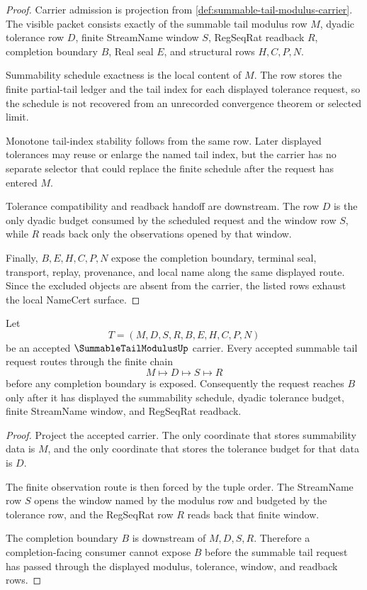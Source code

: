 \begin{proof}
Carrier admission is projection from \autoref{def:summable-tail-modulus-carrier}. The visible packet consists exactly of the summable tail modulus row $M$, dyadic tolerance row $D$, finite StreamName window $S$, RegSeqRat readback $R$, completion boundary $B$, Real seal $E$, and structural rows $H,C,P,N$.

Summability schedule exactness is the local content of $M$. The row stores the finite partial-tail ledger and the tail index for each displayed tolerance request, so the schedule is not recovered from an unrecorded convergence theorem or selected limit.

Monotone tail-index stability follows from the same row. Later displayed tolerances may reuse or enlarge the named tail index, but the carrier has no separate selector that could replace the finite schedule after the request has entered $M$.

Tolerance compatibility and readback handoff are downstream. The row $D$ is the only dyadic budget consumed by the scheduled request and the window row $S$, while $R$ reads back only the observations opened by that window.

Finally, $B,E,H,C,P,N$ expose the completion boundary, terminal seal, transport, replay, provenance, and local name along the same displayed route. Since the excluded objects are absent from the carrier, the listed rows exhaust the local NameCert surface.
\end{proof}

\begin{theorem}
\label{thm:summable-tail-modulus-regular-cauchy-criterion}
Let
$$
T=(M,D,S,R,B,E,H,C,P,N)
$$
be an accepted $\SummableTailModulusUp$ carrier. Every accepted summable tail request routes through the finite chain
$$
M \longmapsto D \longmapsto S \longmapsto R
$$
before any completion boundary is exposed. Consequently the request reaches $B$ only after it has displayed the summability schedule, dyadic tolerance budget, finite StreamName window, and RegSeqRat readback.
\end{theorem}
\begin{proof}
Project the accepted carrier. The only coordinate that stores summability data is $M$, and the only coordinate that stores the tolerance budget for that data is $D$.

The finite observation route is then forced by the tuple order. The StreamName row $S$ opens the window named by the modulus row and budgeted by the tolerance row, and the RegSeqRat row $R$ reads back that finite window.

The completion boundary $B$ is downstream of $M,D,S,R$. Therefore a completion-facing consumer cannot expose $B$ before the summable tail request has passed through the displayed modulus, tolerance, window, and readback rows.
\end{proof}

